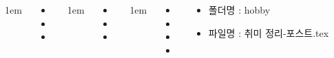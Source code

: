 \documentclass[	20pt, 
							a0paper, 
							landscape,
							margin=0mm, %
							innermargin=10mm,  		%
							blockverticalspace=4mm, %
							colspace=5mm, 
							subcolspace=0mm
							]{tikzposter}
\begin{document}
\begin{columns}
			{
					\setlength{\leftmargini}{4em}
					\setlength{\labelsep} {1em}
				\begin{LARGE}
					\begin{itemize}
					\item 
					\item 
					\item 
					\end{itemize}
				\end{LARGE}
			} %


			{
					\setlength{\leftmargini}{4em}
					\setlength{\labelsep} {1em}
				\begin{LARGE}
					\begin{itemize}
					\item 
					\item 
					\item 
					\end{itemize}
				\end{LARGE}
			} %







			{
					\setlength{\leftmargini}{3em}
					\setlength{\labelsep} {1em}
				\begin{LARGE}
					\begin{itemize}
					\item 
					\item 
					\item 
					\item 
					\end{itemize}
				\end{LARGE}
			} %

			{
				\begin{LARGE}
					\begin{itemize}
					\item 폴더명 : hobby
					\item 파일명 : 취미 정리-포스트.tex
					\end{itemize}
				\end{LARGE}
			}




	\end{columns}
\end{document}
